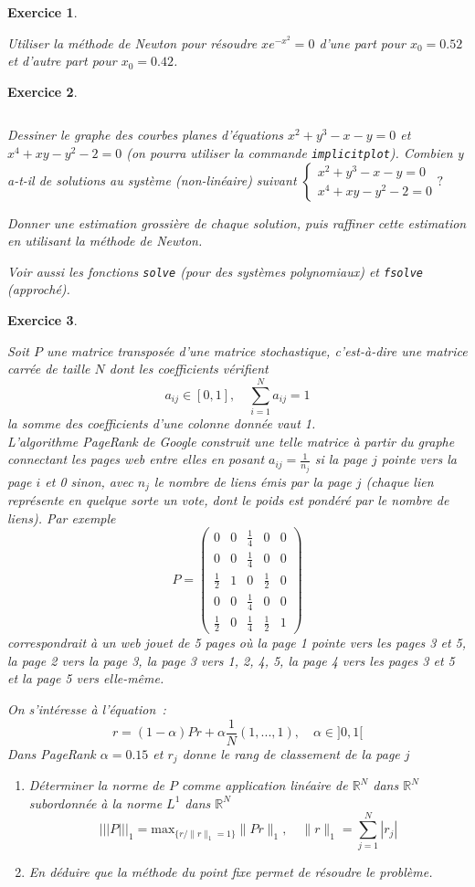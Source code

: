 \documentclass[10pt,a4paper]{article}
\newcommand{\R}{\mathbb R}
\newtheorem{exer}{Exercice}
\def\bexer{\begin{exer}\begin{em}}\def\eexer{\end{em}\end{exer}}
\begin{document}
\bexer
Utiliser la méthode de Newton pour résoudre $xe^{-x^2}=0$ d'une part
pour $x_0=0.52$ et d'autre part pour $x_0=0.42$.

\eexer
\bexer

$\ $

Dessiner le graphe des courbes planes d'\'equations
$x^2+y^3-x-y=0$ et $x^4+xy-y^2-2=0$ (on pourra utiliser la
commande \verb|implicitplot|). Combien y a-t-il de solutions au
syst\`eme (non-lin\'eaire) suivant $
\left\{ \begin{array}{l}
    x^2+y^3-x-y=0\\
    x^4+xy-y^2-2=0
\end{array}\right.?
 $

Donner une estimation grossi\`ere de chaque solution, puis raffiner
cette estimation en utilisant la m\'ethode de Newton.

Voir aussi les fonctions \verb|solve| (pour des syst\`emes
polynomiaux)  et \verb|fsolve| (approch\'e).
\eexer


\bexer
Soit $P$ une matrice transpos\'ee d'une matrice stochastique,
c'est-\`a-dire une matrice carr\'ee de taille $N$ dont les coefficients v\'erifient
$$ a_{ij} \in [0,1], \quad \sum_{i=1}^N a_{ij} =1 $$
la somme des coefficients d'une colonne donn\'ee vaut 1.\\
L'algorithme PageRank de Google construit une telle matrice \`a partir
du graphe connectant les pages web entre elles en posant
$a_{ij}=\frac{1}{n_j}$ si la page $j$ pointe vers la page $i$ et 0
sinon, avec $n_j$ le nombre de liens \'emis par la page $j$ (chaque lien
repr\'esente en quelque sorte un vote, dont le poids est pond\'er\'e
par le nombre de liens). Par
exemple
\[ P= \left(\begin{array}{ccccc}
0 & 0 & \frac{1}{4} & 0 & 0 \\
0 & 0 & \frac{1}{4} & 0 & 0 \\
\frac{1}{2} & 1 & 0 & \frac{1}{2} & 0 \\
0 & 0 & \frac{1}{4} & 0 & 0 \\
\frac{1}{2} & 0 & \frac{1}{4} & \frac{1}{2} & 1
\end{array}\right) \]
correspondrait \`a un web jouet de 5 pages
 o\`u la page 1 pointe vers les pages 3
et 5, la page 2 vers la page 3, la page 3 vers 1, 2, 4, 5, 
la page 4
vers les pages 3 et 5 et la page 5 vers elle-m\^eme.

On s'int\'eresse \`a l'\'equation~:
\[ r =(1-\alpha)Pr+\alpha \frac1N (1,...,1), \quad \alpha \in ]0,1[ \]
Dans PageRank $\alpha=0.15$ et
$r_j$ donne le rang de classement de la page $j$
\begin{enumerate}
\item D\'eterminer la norme de $P$ comme application lin\'eaire
de $\R^N$ dans $\R^N$ subordonn\'ee \`a la norme $L^1$ dans $\R^N$
$$ |||P|||_1 = \mbox{max}_{\{r/\|r\|_1=1\}} \|Pr\|_1, \quad
\|r\|_1=\sum_{j=1}^N |r_j| $$
\item En d\'eduire que la m\'ethode du point fixe permet
de r\'esoudre le probl\`eme.
\end{enumerate}
\eexer
\end{document}
